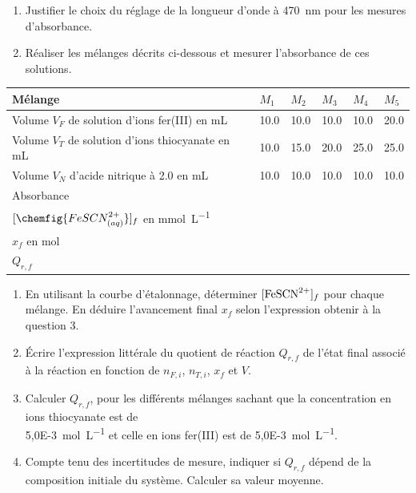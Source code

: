 \documentclass[a4paper,11pt,fleqn]{scrartcl}%
\begin{document}
\begin{enumerate}[resume]
	\item Justifier le choix du réglage de la longueur d'onde à \SI{470}{\nano \meter} pour les mesures d'absorbance.
	\item Réaliser les mélanges décrits ci-dessous et mesurer l'absorbance de ces solutions.
\end{enumerate}
\begin{tabular}{|>{\centering}m{6cm}|>{\centering}m{2cm}|>{\centering}m{2cm}|>{\centering}m{2cm}|>{\centering}m{2cm}|>{\centering\arraybackslash}m{2cm}|}
\hline Mélange & $M_1$ & $M_2$& $M_3$& $M_4$& $M_5$\\
\hline Volume $V_F$ de solution d'ions fer(III) en \unit{\milli \liter} & \num{10,0}& \num{10,0} & \num{10,0}& \num{10,0} & \num{20,0}\\
\hline Volume $V_T$ de solution d'ions thiocyanate en \unit{\milli \liter} & \num{10,0}& \num{15,0}& \num{20,0}& \num{25,0} & \num{25,0}\\
\hline Volume $V_N$ d'acide nitrique à \num{2,0}  en \unit{\milli \liter} & \num{10,0} & \num{10,0} & \num{10,0} & \num{10,0} & \num{10,0}\\
\hline Absorbance & & & & & \rule[1cm]{0cm}{0cm}\\
\hline $[\chemfig{FeSCN^{2+}_{(aq)}}]_f$ en \unit{\milli \mole \per \liter}& & & & & \rule[1cm]{0cm}{0cm}\\
\hline $x_f$ en \unit{\mole} & & & & & \rule[1cm]{0cm}{0cm}\\
\hline $Q_{r,f}$ & & & & & \rule[1cm]{0cm}{0cm}\\
\hline
\end{tabular}
\begin{enumerate}[resume]
	\item En utilisant la courbe d'étalonnage, déterminer $[\ce{FeSCN^{2+}}]_f$ pour chaque mélange. En déduire l'avancement final $x_f$ selon l'expression obtenir à la question 3.
	\item Écrire l'expression littérale du quotient de réaction $Q_{r,f}$ de l'état final associé à la réaction en fonction de $n_{F,i}$, $n_{T,i}$, $x_f$ et $V$.
	\item Calculer $Q_{r,f}$, pour les différents mélanges sachant que la concentration en ions thiocyanate est de \\ \SI{5,0E-3}{\mole \per \liter} et celle en ions fer(III) est de \SI{5,0E-3}{\mole \per \liter}.
	\item Compte tenu des incertitudes de mesure, indiquer si $Q_{r,f}$ dépend de la composition initiale du système. Calculer sa valeur moyenne.
\end{enumerate}
\end{document}
